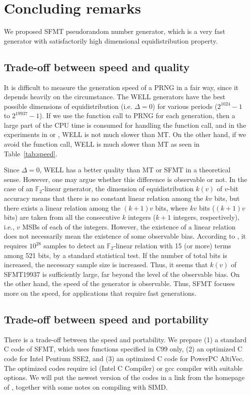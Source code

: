 \documentclass[acmnow]{acmtrans2m}
\def\F2{{\mathbb F}_2}
\begin{document}
\section{Concluding remarks}
We proposed SFMT pseudorandom number generator, 
which is a very fast generator with satisfactorily
high dimensional equidistribution property. 

\subsection{Trade-off between speed and quality}
It is difficult to measure the generation speed of a PRNG in a fair way,
since it depends heavily on the circumstance. 
The 
WELL \cite{WELL} generators have the best possible dimensions of 
equidistribution (i.e. $\Delta=0$)
for various periods ($2^{1024}-1$ to $2^{19937}-1$).
If we use the function call to PRNG
for each generation, then a large part of the CPU time
is consumed for handling the function call, and in the 
experiments in \cite{WELL} or \cite{XORSHIFT}, WELL 
is not much slower than MT. On the other hand, if we avoid
the function call, WELL is much slower than MT as seen
in Table~\ref{tab:speed}. 

Since $\Delta=0$, WELL has a better quality than MT or SFMT
in a theoretical sense. 
However, one may argue whether this difference is 
observable or not. In the case of an $\F2$-linear generator,
the dimension of equidistribution $k(v)$ of $v$-bit accuracy
means that
there is no constant linear relation among the 
$kv$ bits, but there exists a linear relation among
the $(k+1)v$ bits, where $kv$ bits 
($(k+1)v$ bits) are taken from
all the consecutive $k$ integers 
($k+1$ integers, respectively), 
i.e., $v$ MSBs of each of the integers. 
However, the existence of a linear relation does not necessarily
mean the existence of some observable bias.
According to \cite{TESTWEIGHT}, it requires $10^{28}$
samples to detect an $\F2$-linear relation with 
15 (or more) terms among 521 bits, by a standard
statistical test. If the number of 
total bits is increased, 
the necessary sample size is increased. Thus, it seems
that $k(v)$ of SFMT19937 is sufficiently large, far beyond
the level of the observable bias. 
On the other hand, the speed of the generator is 
observable.
Thus, SFMT focuses more on the speed, for applications
that require fast generations. 

\subsection{Trade-off between speed and portability}\label{sec:portability}
There is a trade-off between the speed and portability.
We prepare (1) a standard C code of SFMT, which uses 
functions specified in C99 only, (2) an optimized C code for
Intel Pentium SSE2, and 
(3) an optimized C code for PowerPC AltiVec. The optimized codes require
icl (Intel C Compiler) or gcc compiler with suitable options.
We will put the newest version of the codes 
in a link from the homepage of \cite{MT}, together with some notes 
on compiling with SIMD.
\end{document}
